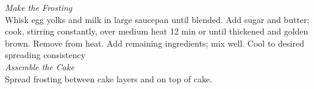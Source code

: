 \begin{recipe}[preparationtime= 2 hours 25 minutes, source = Meghan]
{		\newline
		\textit{Make the Frosting}\\
		\step Whisk egg yolks and milk in large saucepan until blended.
		\step Add sugar and butter; cook, stirring constantly, over medium heat 12 min or until thickened and golden brown. Remove from heat.
		\step Add remaining ingredients; mix well. Cool to desired spreading consistency\\
		\newline
		\textit{Assemble the Cake}\\
		\step Spread frosting between cake layers and on top of cake.
}
\end{recipe}

